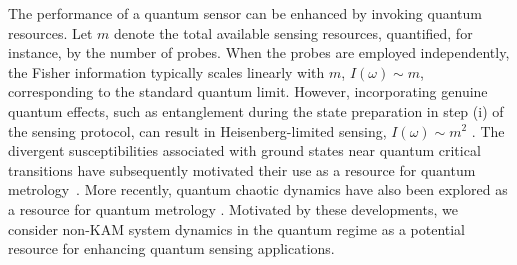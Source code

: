 \documentclass[amsmath,nobibnotes,aps,amssymb,pra, prl,aps,showpacs,superscriptaddress,twocolumn, longbibliography, reprint]{revtex4-2}
\begin{document}
The performance of a quantum sensor can be enhanced by invoking quantum resources. Let $m$ denote the total available sensing resources, quantified, for instance, by the number of probes. When the probes are employed independently, the Fisher information typically scales linearly with $m$, $I(\omega)\sim m$, corresponding to the standard quantum limit. However, incorporating genuine quantum effects, such as entanglement during the state preparation in step (i) of the sensing protocol, can result in Heisenberg-limited sensing, $I(\omega)\sim m^2$ \cite{giovannetti2004quantum, giovannetti2006quantum}. The divergent susceptibilities associated with ground states near quantum critical transitions have subsequently motivated their use as a resource for quantum metrology~\cite{zanardi2008quantum, invernizzi2008optimal, ivanov2013adiabatic, tsang2013quantum, macieszczak2016dynamical, rams2018limits, frerot2018quantum, chu2021dynamic, garbe2020critical, garbe2022critical, gietka2022understanding}. More recently, quantum chaotic dynamics have also been explored as a resource for quantum metrology \cite{fiderer2018quantum, liu2021quantum}. Motivated by these developments, we consider non-KAM system dynamics in the quantum regime as a potential resource for enhancing quantum sensing applications.

\end{document}
